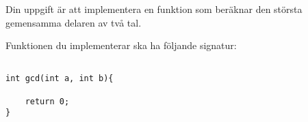 
Din uppgift är att implementera en funktion som beräknar den största gemensamma delaren av två tal.

Funktionen du implementerar ska ha följande signatur:

\begin{verbatim}

int gcd(int a, int b){

	return 0;
}

\end{verbatim}
